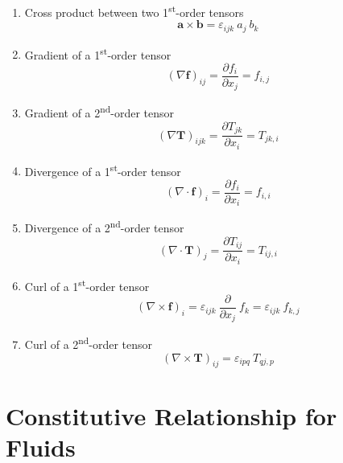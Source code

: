 \documentclass[a4paper]{article}
\begin{document}
\begin{multicols}{2}
\begin{enumerate}
    \item Cross product between two 1\textsuperscript{st}-order tensors
    \[\mathbf{a} \times \mathbf{b} = \varepsilon_{ijk} \ a_{j} \ b_{k}\]
    
    \item Gradient of a 1\textsuperscript{st}-order tensor
    \[ (\nabla \mathbf{f})_{ij} = \frac{\partial f_{i}}{\partial x_{j}} = f_{i,j}\]

    \item Gradient of a 2\textsuperscript{nd}-order tensor
    \[ (\nabla \mathbf{T})_{ijk} = \frac{\partial T_{jk}}{\partial x_{i}} = T_{jk, i}\]
    
    \item Divergence of a 1\textsuperscript{st}-order tensor
    \[(\nabla \cdot \mathbf{f})_{i} = \frac{\partial f_{i}}{\partial x_{i}} = f_{i,i}\]
    
    \item Divergence of a 2\textsuperscript{nd}-order tensor
    \[(\nabla \cdot \mathbf{T})_{j} = \frac{\partial T_{ij}}{\partial x_{i}} = T_{ij, i}\]
    
    \item Curl of a 1\textsuperscript{st}-order tensor
    \[(\nabla \times \mathbf{f})_i = \varepsilon_{ijk} \ \frac{\partial}{\partial x_{j}} \ f_{k} = \varepsilon_{ijk} \ f_{k,j}\]

    \item Curl of a 2\textsuperscript{nd}-order tensor
    \[(\nabla \times \mathbf{T})_{ij} = \varepsilon_{ipq} \ T_{qj,p}\]
\end{enumerate}
\end{multicols}

\section{Constitutive Relationship for Fluids}
\end{document}
